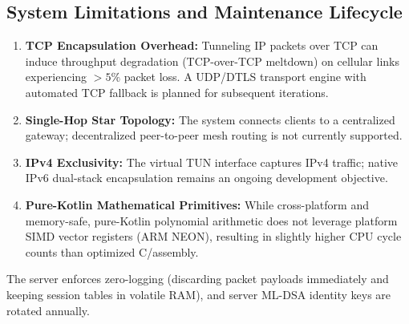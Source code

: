 \subsection{System Limitations and Maintenance Lifecycle}
\begin{enumerate}
    \item \textbf{TCP Encapsulation Overhead:} Tunneling IP packets over TCP can induce throughput degradation (TCP-over-TCP meltdown) on cellular links experiencing $> 5\%$ packet loss. A UDP/DTLS transport engine with automated TCP fallback is planned for subsequent iterations.
    \item \textbf{Single-Hop Star Topology:} The system connects clients to a centralized gateway; decentralized peer-to-peer mesh routing is not currently supported.
    \item \textbf{IPv4 Exclusivity:} The virtual TUN interface captures IPv4 traffic; native IPv6 dual-stack encapsulation remains an ongoing development objective.
    \item \textbf{Pure-Kotlin Mathematical Primitives:} While cross-platform and memory-safe, pure-Kotlin polynomial arithmetic does not leverage platform SIMD vector registers (ARM NEON), resulting in slightly higher CPU cycle counts than optimized C/assembly.
\end{enumerate}
The server enforces zero-logging (discarding packet payloads immediately and keeping session tables in volatile RAM), and server ML-DSA identity keys are rotated annually.
